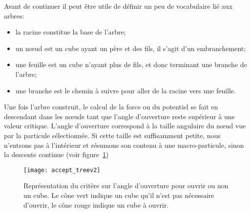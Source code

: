 			Avant de continuer il peut être utile de définir un peu de vocabulaire lié aux arbres:
			\begin{itemize}
				\item la racine constitue la base de l'arbre;
				\item un nœud est un cube ayant un père et des fils, il s'agit d'un embranchement;
				\item une feuille est un cube n'ayant plus de fils, et donc terminant une branche de
					l'arbre;
				\item une branche est le chemin à suivre pour aller de la racine vers une feuille.
			\end{itemize}


			Une fois l'arbre construit, le calcul de la force ou du potentiel se fait en descendant dans les nœuds
			tant que l'angle d'ouverture reste supérieur à une valeur critique.
			L'angle d'ouverture correspond à la taille angulaire du nœud vue par la particule sélectionnée.
			Si cette taille est suffisamment petite, nous n'entrons pas à l'intérieur et résumons son
			contenu à une macro-particule, sinon la descente continue (voir figure~\ref{Fig::KDTree::Parcours})%

			\begin{figure}
				\begin{center}
					\texttt{[image: accept\_treev2]}
					\caption{\label{Fig::KDTree::Parcours}Représentation du critère sur l'angle
					d'ouverture pour ouvrir ou non un cube. Le cône vert indique un cube qu'il
					n'est pas nécessaire d'ouvrir, le cône rouge indique un cube à ouvrir.}
				\end{center}
			\end{figure}

